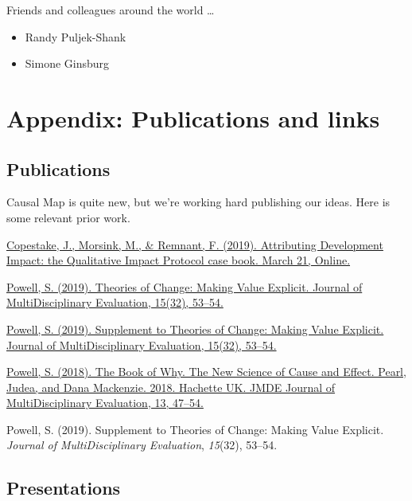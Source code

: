 \documentclass[
]{book}
\begin{document}
Friends and colleagues around the world \ldots{}

\begin{itemize}
\item
  Randy Puljek-Shank
\item
  Simone Ginsburg
\end{itemize}

\hypertarget{appendix-publications-and-links}{%
\chapter{Appendix: Publications and links}\label{appendix-publications-and-links}}

\hypertarget{publications}{%
\section{Publications}\label{publications}}

Causal Map is quite new, but we're working hard publishing our ideas. Here is some relevant prior work.

\href{https://practicalactionpublishing.com/book/105/attributing-development-impact}{Copestake, J., Morsink, M., \& Remnant, F. (2019). Attributing Development Impact: the Qualitative Impact Protocol case book. March 21, Online.}

\href{https://journals.sfu.ca/jmde/index.php/jmde_1/article/view/563}{Powell, S. (2019). Theories of Change: Making Value Explicit. Journal of MultiDisciplinary Evaluation, 15(32), 53--54.}

\href{https://journals.sfu.ca/jmde/index.php/jmde_1/article/view/561}{Powell, S. (2019). Supplement to Theories of Change: Making Value Explicit. Journal of MultiDisciplinary Evaluation, 15(32), 53--54.}

\href{https://journals.sfu.ca/jmde/index.php/jmde_1/article/view/507}{Powell, S. (2018). The Book of Why. The New Science of Cause and Effect. Pearl, Judea, and Dana Mackenzie. 2018. Hachette UK. JMDE Journal of MultiDisciplinary Evaluation, 13, 47--54.}

Powell, S. (2019). Supplement to Theories of Change: Making Value Explicit. \emph{Journal of MultiDisciplinary Evaluation}, \emph{15}(32), 53--54.

\hypertarget{presentations}{%
\section{Presentations}\label{presentations}}
\end{document}
